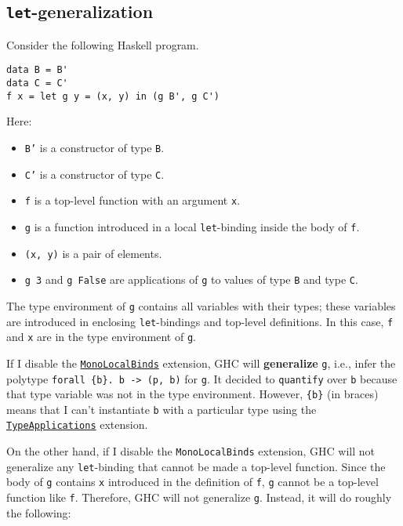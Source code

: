 \subsection{\texttt{let}-generalization}

Consider the following Haskell program.

\begin{verbatim}
data B = B'
data C = C'
f x = let g y = (x, y) in (g B', g C')
\end{verbatim}

Here:

\begin{itemize}
    \item \texttt{B'} is a constructor of type \texttt{B}.
    \item \texttt{C'} is a constructor of type \texttt{C}.
    \item \texttt{f} is a top-level function with an argument \texttt{x}.
    \item \texttt{g} is a function introduced in a local \texttt{let}-binding inside the body of \texttt{f}.
    \item \texttt{(x, y)} is a pair of elements.
    \item \texttt{g 3} and \texttt{g False} are applications of \texttt{g} to values of type \texttt{B} and type \texttt{C}.
\end{itemize}

The type environment of \texttt{g} contains all variables with their types; these variables are introduced in enclosing \texttt{let}-bindings and top-level definitions. In this case, \texttt{f} and \texttt{x} are in the type environment of \texttt{g}.

If I disable the \href{https://ghc.gitlab.haskell.org/ghc/doc/users_guide/exts/let_generalisation.html}{\texttt{MonoLocalBinds}} extension, GHC will \textbf{generalize} \texttt{g}, i.e., infer the polytype \texttt{forall \{b\}. b -> (p, b)} for \texttt{g}. It decided to \texttt{quantify} over \texttt{b} because that type variable was not in the type environment. However, \texttt{\{b\}} (in braces) means that I can't instantiate \texttt{b} with a particular type using the \href{https://ghc.gitlab.haskell.org/ghc/doc/users_guide/exts/type_applications.html}{\texttt{TypeApplications}} extension.

On the other hand, if I disable the \texttt{MonoLocalBinds} extension, GHC will not generalize any \texttt{let}-binding that cannot be made a top-level function. Since the body of \texttt{g} contains \texttt{x} introduced in the definition of \texttt{f}, \texttt{g} cannot be a top-level function like \texttt{f}. Therefore, GHC will not generalize \texttt{g}. Instead, it will do roughly the following:

